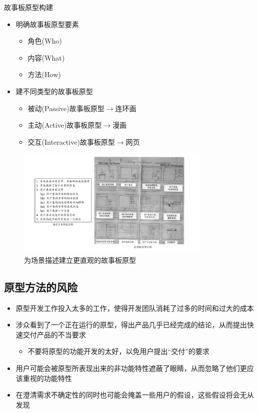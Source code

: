 故事板原型构建
\begin{itemize}
    \item 明确故事板原型要素
    \vspace{-0.8em}
    \begin{multicols}{3}
    \begin{itemize}
        \item 角色(Who)
        \item 内容(What)
        \item 方法(How)
    \end{itemize}
    \end{multicols}
    \vspace{-1em}
    \item 建不同类型的故事板原型
    \begin{itemize}
        \item 被动(Passive)故事板原型$\rightarrow$连环画
        \item 主动(Active)故事板原型$\rightarrow$漫画
        \item 交互(Interactive)故事板原型$\rightarrow$网页   
    \end{itemize}
\end{itemize}

\begin{figure}[H]
	\centering
    \vspace{-0.5em}
	\includegraphics[width=0.83\textwidth]{img/为场景描述建立更直观的故事板原型.pdf}
    \caption*{为场景描述建立更直观的故事板原型}
    \vspace{-1em}
\end{figure}

\subsection{原型方法的风险}
\begin{itemize}
    \item 原型开发工作投入太多的工作，使得开发团队消耗了过多的时间和过大的成本
    \item 涉众看到了一个正在运行的原型，得出产品几乎已经完成的结论，从而提出快速交付产品的不当要求
    \begin{itemize}
        \item 不要将原型的功能开发的太好，以免用户提出“交付”的要求
    \end{itemize}
    \item 用户可能会被原型所表现出来的非功能特性遮蔽了眼睛，从而忽略了他们更应该重视的功能特性
    \item 在澄清需求不确定性的同时也可能会掩盖一些用户的假设，这些假设将会无从发现
\end{itemize}

